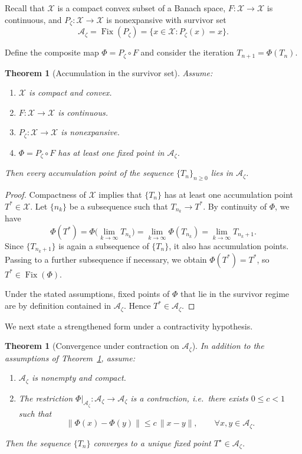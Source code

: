 \documentclass[11pt]{article}
\theoremstyle{definition}
\theoremstyle{plain}
\newtheorem{theorem}[definition]{Theorem}
\theoremstyle{remark}
\newcommand{\Azet}{\mathcal{A}_\zeta}
\newcommand{\Xc}{\mathcal{X}}
\begin{document}
Recall that $\Xc$ is a compact convex subset of a Banach space, $F:\Xc\to\Xc$ is continuous, and $P_\zeta:\Xc\to\Xc$ is nonexpansive with survivor set
\[
\Azet = \operatorname{Fix}(P_\zeta) = \{x\in\Xc: P_\zeta(x)=x\}.
\]

Define the composite map $\Phi=P_\zeta\circ F$ and consider the iteration $T_{n+1}=\Phi(T_n)$.

\begin{theorem}[Accumulation in the survivor set]
\label{thm:appendix-accumulation}
Assume:
\begin{enumerate}
  \item $\Xc$ is compact and convex.
  \item $F:\Xc\to\Xc$ is continuous.
  \item $P_\zeta:\Xc\to\Xc$ is nonexpansive.
  \item $\Phi=P_\zeta\circ F$ has at least one fixed point in $\Azet$.
\end{enumerate}
Then every accumulation point of the sequence $\{T_n\}_{n\ge 0}$ lies in $\Azet$.
\end{theorem}

\begin{proof}
Compactness of $\Xc$ implies that $\{T_n\}$ has at least one accumulation point $T^*\in\Xc$. Let $\{n_k\}$ be a subsequence such that $T_{n_k}\to T^*$. By continuity of $\Phi$, we have
\[
\Phi(T^*) = \Phi\bigl(\lim_{k\to\infty} T_{n_k}\bigr) = \lim_{k\to\infty} \Phi(T_{n_k}) = \lim_{k\to\infty} T_{n_k+1}.
\]
Since $\{T_{n_k+1}\}$ is again a subsequence of $\{T_n\}$, it also has accumulation points. Passing to a further subsequence if necessary, we obtain $\Phi(T^*)=T^*$, so $T^*\in\operatorname{Fix}(\Phi)$.

Under the stated assumptions, fixed points of $\Phi$ that lie in the survivor regime are by definition contained in $\Azet$. Hence $T^*\in\Azet$.
\end{proof}

We next state a strengthened form under a contractivity hypothesis.

\begin{theorem}[Convergence under contraction on $\Azet$]
\label{thm:appendix-contraction}
In addition to the assumptions of Theorem~\ref{thm:appendix-accumulation}, assume:
\begin{enumerate}
  \item $\Azet$ is nonempty and compact.
  \item The restriction $\Phi|_{\Azet}:\Azet\to\Azet$ is a contraction, i.e.\ there exists $0\le c<1$ such that
  \[
    \|\Phi(x)-\Phi(y)\| \le c\,\|x-y\|,\qquad \forall x,y\in\Azet.
  \]
\end{enumerate}
Then the sequence $\{T_n\}$ converges to a unique fixed point $T^\star\in\Azet$.
\end{theorem}
\end{document}
